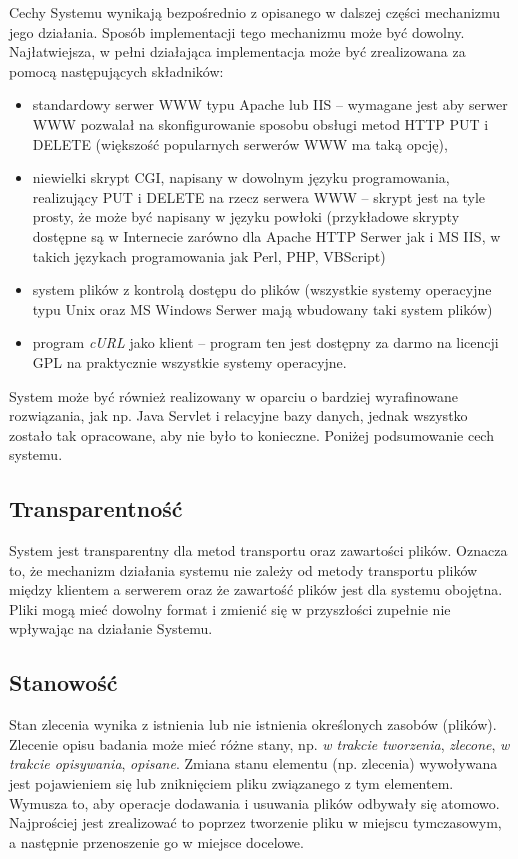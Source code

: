 \documentclass[a4paper]{article}
\begin{document}
Cechy Systemu wynikają bezpośrednio z opisanego w dalszej części mechanizmu jego działania.
Sposób implementacji tego mechanizmu może być dowolny. Najłatwiejsza, w pełni działająca
implementacja może być zrealizowana za pomocą następujących składników:
\begin{itemize}
  \item standardowy serwer WWW typu Apache lub IIS -- wymagane jest aby serwer
  WWW pozwalał na skonfigurowanie sposobu obsługi metod HTTP PUT i DELETE
  (większość popularnych serwerów WWW ma taką opcję),
  \item niewielki skrypt CGI, napisany w dowolnym języku programowania,
  realizujący PUT i DELETE na rzecz serwera WWW -- skrypt jest na tyle prosty, że może być
  napisany w języku powłoki (przykładowe skrypty dostępne są w Internecie zarówno
  dla Apache HTTP Serwer jak i MS IIS, w takich językach programowania jak Perl,
  PHP, VBScript)
  \item system plików z kontrolą dostępu do plików (wszystkie systemy
  operacyjne typu Unix oraz MS Windows Serwer mają wbudowany taki system plików)
  \item program \emph{cURL} jako klient -- program ten jest dostępny 
  za darmo na licencji GPL na praktycznie wszystkie systemy operacyjne.
\end{itemize}

System może być również realizowany w oparciu o bardziej wyrafinowane
rozwiązania, jak np. Java Servlet i relacyjne bazy danych, jednak wszystko
zostało tak opracowane, aby nie było to konieczne.  Poniżej podsumowanie cech systemu.

\subsection{Transparentność}

System jest transparentny dla metod transportu oraz zawartości plików. Oznacza
to, że mechanizm działania systemu nie zależy od metody transportu plików
między klientem a serwerem oraz że zawartość plików jest dla systemu obojętna.
Pliki mogą mieć dowolny format i zmienić się w przyszłości zupełnie nie wpływając
na działanie Systemu. 

\subsection{Stanowość}

Stan zlecenia wynika z istnienia lub nie istnienia określonych zasobów (plików). Zlecenie
opisu badania może mieć różne stany, np. \emph{w trakcie tworzenia}, \emph{zlecone},
\emph{w trakcie opisywania}, \emph{opisane}. Zmiana stanu elementu (np. zlecenia)
wywoływana jest pojawieniem się lub zniknięciem pliku związanego z tym elementem. Wymusza
to, aby operacje dodawania i usuwania plików odbywały się atomowo. Najprościej jest
zrealizować to poprzez tworzenie pliku w miejscu tymczasowym, a następnie przenoszenie go w
miejsce docelowe.
\end{document}
